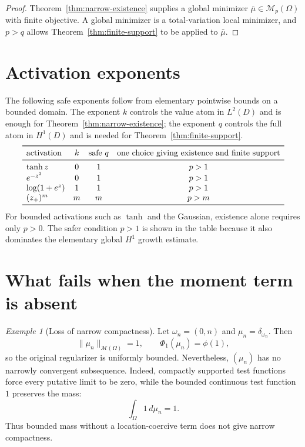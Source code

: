 \documentclass[11pt]{amsart}
\theoremstyle{definition}
\theoremstyle{remark}
\newtheorem{example}[theorem]{Example}
\newcommand{\M}{\mathcal{M}}
\begin{document}
\begin{proof}
Theorem~\ref{thm:narrow-existence} supplies a global minimizer
$\bar\mu\in\M_p(\Omega)$ with finite objective.  A global minimizer is a
total-variation local minimizer, and $p>q$ allows
Theorem~\ref{thm:finite-support} to be applied to $\bar\mu$.
\end{proof}

\section{Activation exponents}

The following safe exponents follow from elementary pointwise bounds on a
bounded domain.  The exponent $k$ controls the value atom in $L^2(D)$ and is
enough for Theorem~\ref{thm:narrow-existence}; the exponent $q$ controls the
full atom in $H^1(D)$ and is needed for
Theorem~\ref{thm:finite-support}.
\[
\begin{array}{lccc}
\toprule
\text{activation} & k & \text{safe }q
& \text{one choice giving existence and finite support}\\
\midrule
\tanh z              &0&1&p>1\\
e^{-z^2}             &0&1&p>1\\
\log(1+e^z)          &1&1&p>1\\
(z_+)^m              &m&m&p>m\\
\bottomrule
\end{array}
\]
For bounded activations such as $\tanh$ and the Gaussian, existence alone
requires only $p>0$.  The safer condition $p>1$ is shown in the table because
it also dominates the elementary global $H^1$ growth estimate.

\section{What fails when the moment term is absent}

\begin{example}[Loss of narrow compactness]
Let $\omega_n=(0,n)$ and $\mu_n=\delta_{\omega_n}$.  Then
\[
  \|\mu_n\|_{\M(\Omega)}=1,
  \qquad
  \Phi_1(\mu_n)=\phi(1),
\]
so the original regularizer is uniformly bounded.  Nevertheless,
$(\mu_n)$ has no narrowly convergent subsequence.  Indeed, compactly supported
test functions force every putative limit to be zero, while the bounded
continuous test function $1$ preserves the mass:
\[
  \int_\Omega1\,d\mu_n=1.
\]
Thus bounded mass without a location-coercive term does not give narrow
compactness.
\end{example}
\end{document}
